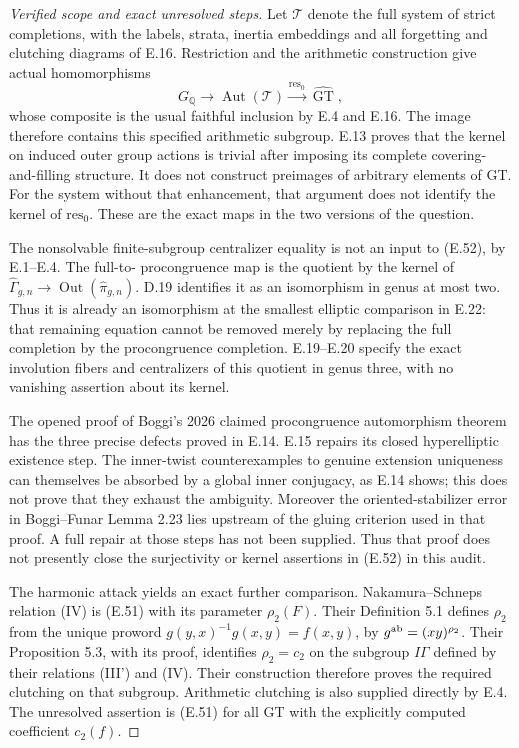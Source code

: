 \begin{proof}[Verified scope and exact unresolved steps]
Let $\mathcal T$ denote the full system of strict
completions, with the labels, strata, inertia embeddings
and all forgetting and clutching diagrams of E.16.
Restriction and the arithmetic construction give actual
homomorphisms
\[
 G_{\mathbb Q}\longrightarrow\operatorname{Aut}(\mathcal T)
       \xrightarrow{\mathrm{res}_0}\widehat{\operatorname{GT}},
                                                               \tag{E.52}
\]
whose composite is the usual faithful inclusion by E.4
and E.16.  The image therefore contains this specified
arithmetic subgroup.  E.13 proves that the kernel on
induced outer group actions is trivial after imposing
its complete covering-and-filling structure.  It does
not construct preimages of arbitrary elements of GT.
For the system without that enhancement, that argument
does not identify the kernel of $\mathrm{res}_0$.
These are the exact maps in the two versions of the
question.

The nonsolvable finite-subgroup centralizer equality
is not an input to (E.52), by E.1--E.4.  The full-to-
procongruence map is the quotient by the kernel of
$\widehat\Gamma_{g,n}\to\operatorname{Out}
(\widehat\pi_{g,n})$.  D.19 identifies it as an
isomorphism in genus at most two.  Thus it is already
an isomorphism at the smallest elliptic comparison in
E.22: that remaining equation cannot be removed merely
by replacing the full completion by the procongruence
completion.  E.19--E.20 specify the exact involution
fibers and centralizers of this quotient in genus
three, with no vanishing assertion about its kernel.

The opened proof of Boggi's 2026 claimed procongruence
automorphism theorem has the three precise defects
proved in E.14.  E.15 repairs its closed hyperelliptic
existence step.  The inner-twist counterexamples to
genuine extension uniqueness can themselves be
absorbed by a global inner conjugacy, as E.14 shows;
this does not prove that they exhaust the ambiguity.
Moreover the oriented-stabilizer error in
Boggi--Funar Lemma 2.23 lies upstream of the gluing
criterion used in that proof.  A full repair at those
steps has not been supplied.  Thus that proof does
not presently close the surjectivity or kernel
assertions in (E.52) in this audit.

The harmonic attack yields an exact further comparison.
Nakamura--Schneps relation (IV) \cite{ET_NS2000} is (E.51) with its
parameter $\rho_2(F)$.  Their Definition 5.1 defines
$\rho_2$ from the unique proword
$g(y,x)^{-1}g(x,y)=f(x,y)$, by
$g^{\rm ab}=(xy)^{\rho_2}$.  Their Proposition 5.3,
with its proof, identifies $\rho_2=c_2$ on the subgroup
$I\Gamma$ defined by their relations (III') and (IV).
Their construction therefore proves the required
clutching on that subgroup.  Arithmetic clutching is
also supplied directly by E.4.  The unresolved
assertion is (E.51) for all GT with the explicitly
computed coefficient $c_2(f)$.


\end{proof}
